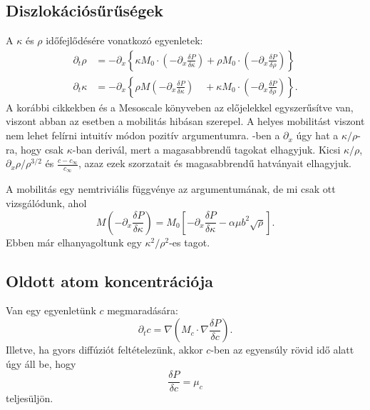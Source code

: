 \documentclass[10pt,a4paper]{scrartcl}
\begin{document}
\subsection{Diszlokációsűrűségek} A $\kappa$ és $\rho$ időfejlődésére vonatkozó egyenletek:
\begin{align} \label{eq:rho_eom}
  {\partial _t}\rho  & =  - {\partial _x}\left\{ {\kappa {M_0} \cdot \left( { - {\partial _x}\frac{{\delta P}}{{\delta \kappa }}} \right) + \rho {M_0} \cdot \left( { - {\partial _x}\frac{{\delta P}}{{\delta \rho }}} \right)} \right\} \\
  {\partial _t}\kappa  & =  - {\partial _x}\left\{ {\rho M\left( { - {\partial _x}\frac{{\delta P}}{{\delta \kappa }}} \right)\quad  + \kappa {M_0} \cdot \left( { - {\partial _x}\frac{{\delta P}}{{\delta \rho }}} \right)} \right\}. \label{eq:kappa_eom}
\end{align}
A korábbi cikkekben és a Mesoscale könyveben az előjelekkel egyszerűsítve van, viszont abban az esetben a mobilitás hibásan szerepel. A helyes mobilitást viszont nem lehet felírni intuitív módon pozitív argumentumra. -ben a $\partial_x$ úgy hat a $\kappa /\rho $-ra, hogy csak $\kappa$-ban derivál, mert a magasabbrendű tagokat elhagyjuk. Kicsi $\kappa /\rho $, ${\partial _x}\rho /{\rho ^{3/2}}$ és $\frac{{c - {c_\infty }}}{{{c_\infty }}}$, azaz ezek szorzatait és magasabbrendű hatványait elhagyjuk.

A mobilitás egy nemtriviális függvénye az argumentumának, de mi csak ott vizsgálódunk, ahol 
\begin{equation} \label{eq:nontriv_mobility}
M\left( { - {\partial _x}\frac{{\delta P}}{{\delta \kappa }}} \right) = {M_0}\left[ { - {\partial _x}\frac{{\delta P}}{{\delta \kappa }} - \alpha \mu {b^2}\sqrt \rho} \right].
\end{equation}
Ebben már elhanyagoltunk egy $ \kappa ^2 / \rho ^2 $-es tagot.

\subsection{Oldott atom koncentrációja} Van egy egyenletünk $c$ megmaradására:
\begin{equation} \label{eq:c_conti}
\partial_t c =  \nabla \left( {{M_c} \cdot \nabla \frac{{\delta P}}{{\delta c}}} \right).
\end{equation}
Illetve, ha gyors diffúziót feltételezünk, akkor $c$-ben az egyensúly rövid idő alatt úgy áll be, hogy
\[\frac{{\delta P}}{{\delta c}} = \mu_c \] teljesüljön.
\end{document}
